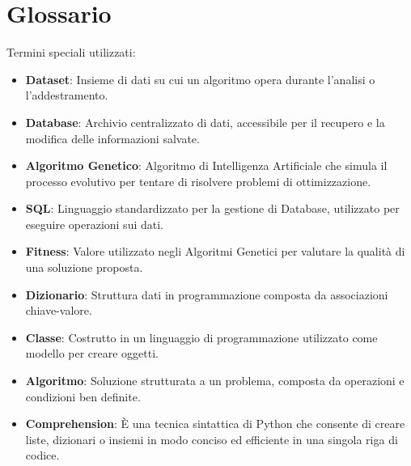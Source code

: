 \documentclass{article}
\begin{document}
\section{Glossario}



Termini speciali utilizzati:

\begin{itemize}


    \item\textbf{Dataset}: Insieme di dati su cui un algoritmo opera durante l'analisi o l'addestramento.

    \item\textbf{Database}: Archivio centralizzato di dati, accessibile per il recupero e la modifica delle informazioni salvate.

    \item\textbf{Algoritmo Genetico}: Algoritmo di Intelligenza Artificiale che simula il processo evolutivo per tentare di risolvere problemi di ottimizzazione.

    \item\textbf{SQL}: Linguaggio standardizzato per la gestione di Database, utilizzato per eseguire operazioni sui dati.

    \item\textbf{Fitness}: Valore utilizzato negli Algoritmi Genetici per valutare la qualità di una soluzione proposta.

    \item\textbf{Dizionario}: Struttura dati in programmazione composta da associazioni chiave-valore.

    \item\textbf{Classe}: Costrutto in un linguaggio di programmazione utilizzato come modello per creare oggetti.

    \item\textbf{Algoritmo}: Soluzione strutturata a un problema, composta da operazioni e condizioni ben definite.

    \item\textbf{Comprehension}: È una tecnica sintattica di Python che consente di creare liste, dizionari o insiemi in modo conciso ed efficiente in una singola riga di codice.

\end{itemize}


\printindex
\end{document}
